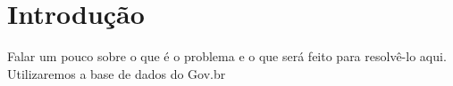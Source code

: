 \section{Introdução}

Falar um pouco sobre o que é o problema e o que será feito para resolvê-lo aqui. Utilizaremos a base de dados do Gov.br~\cite{govbr}